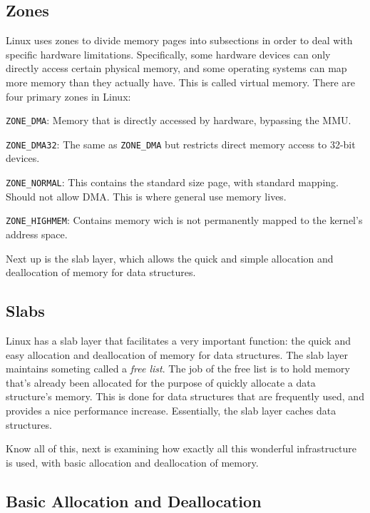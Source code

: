   \subsection{Zones}
	Linux uses zones to divide memory pages into subsections in order to
	deal with specific hardware limitations. Specifically, some hardware
	devices can only directly access certain physical memory, and some
	operating systems can map more memory than they actually have. This is
	called virtual memory. There are four primary zones in Linux:
	\begin{description}
		\item \texttt{ZONE\_DMA}: Memory that is directly accessed by
			hardware, bypassing the MMU.
		\item \texttt{ZONE\_DMA32}: The same as \texttt{ZONE\_DMA} but
			restricts direct memory access to 32-bit devices.
		\item \texttt{ZONE\_NORMAL}: This contains the standard size
			page, with standard mapping. Should not allow DMA. This
			is where general use memory lives.
		\item \texttt{ZONE\_HIGHMEM}: Contains memory wich is not
			permanently mapped to the kernel's address space.
	\end{description}
	\cite{robertlove2010}
	Next up is the slab layer, which allows the quick and simple allocation
	and deallocation of memory for data structures.
  \subsection{Slabs}
	Linux has a slab layer that facilitates a very important function: the
	quick and easy allocation and deallocation of memory for data
	structures. The slab layer maintains someting called a \textit{free list}.
	The job of the free list is to hold memory that's already been allocated
	for the purpose of quickly allocate a data structure's memory. This is
	done for data structures that are frequently used, and provides a nice
	performance increase. Essentially, the slab layer caches data structures.
	\cite{robertlove2010}

	Know all of this, next is examining how exactly all this wonderful
	infrastructure is used, with basic allocation and deallocation of memory.

   \subsection{Basic Allocation and Deallocation}
